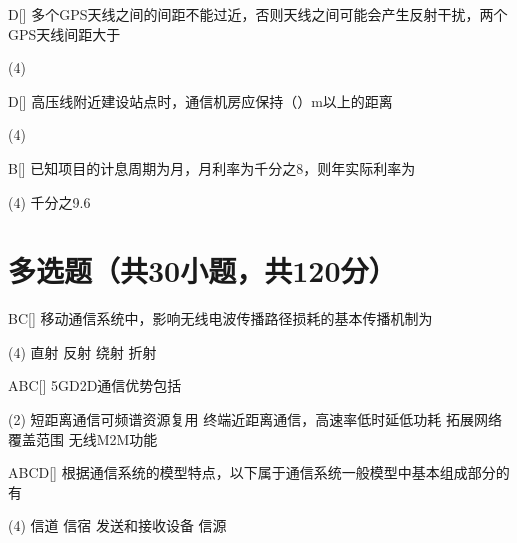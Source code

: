 \begin{choice}{D}[]
    多个GPS天线之间的间距不能过近，否则天线之间可能会产生反射干扰，两个GPS天线间距大于
    \begin{tasks}(4)
    \end{tasks}
\end{choice}


\begin{choice}{D}[]
    高压线附近建设站点时，通信机房应保持（\quad）m以上的距离
    \begin{tasks}(4)
    \end{tasks}
\end{choice}


\begin{choice}{B}[]
    已知项目的计息周期为月，月利率为千分之8，则年实际利率为
    \begin{tasks}(4)
        \task 千分之9.6
    \end{tasks}
\end{choice}



\section{多选题（共30小题，共120分）}

\begin{choice}{\;BC\;}[]
    移动通信系统中，影响无线电波传播路径损耗的基本传播机制为
    \begin{tasks}(4)
        \task 直射
        \task 反射
        \task 绕射
        \task 折射
    \end{tasks}
\end{choice}

\begin{choice}{\;ABC\;}[]
    5GD2D通信优势包括
    \begin{tasks}(2)
        \task 短距离通信可频谱资源复用
        \task 终端近距离通信，高速率低时延低功耗
        \task 拓展网络覆盖范围
        \task 无线M2M功能
    \end{tasks}
\end{choice}

\begin{choice}{\;ABCD\;}[]
    根据通信系统的模型特点，以下属于通信系统一般模型中基本组成部分的有
    \begin{tasks}(4)
        \task 信道
        \task 信宿
        \task 发送和接收设备
        \task 信源
    \end{tasks}
\end{choice}

